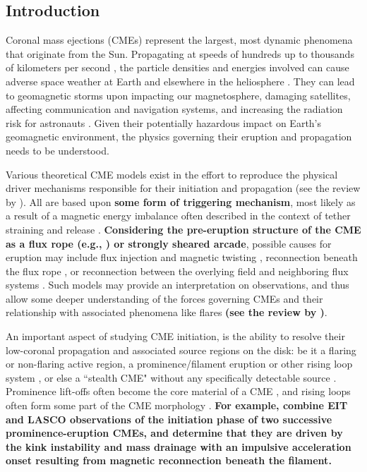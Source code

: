 \documentclass[namedreferences]{solarphysics}
\begin{document}
\begin{article}
\section{Introduction}
\label{intro}

Coronal mass ejections (CMEs) represent the largest, most dynamic phenomena that originate from the Sun. Propagating at speeds of hundreds up to thousands of kilometers per second \cite{2004JGRA..10907105Y}, the particle densities and energies involved can cause adverse space weather at Earth and elsewhere in the heliosphere \cite{2005AnGeo..23.1033S}. They can lead to geomagnetic storms upon impacting our magnetosphere, damaging satellites, affecting communication and navigation systems, and increasing the radiation risk for astronauts \cite{2007A&G....48f..11L}. Given their potentially hazardous impact on Earth's geomagnetic environment, the physics governing their eruption and propagation needs to be understood. 

Various theoretical CME models exist in the effort to reproduce the physical driver mechanisms responsible for their initiation and propagation (see the review by ). All are based upon {\bf some form of triggering mechanism}, most likely as a result of a magnetic energy imbalance often described in the context of tether straining and release \cite{2001AGUGM.125..143K}. {\bf Considering the pre-eruption structure of the CME as a flux rope (e.g., ) or strongly sheared arcade}, possible causes for eruption may include flux injection and magnetic twisting \cite{2006PhRvL..96y5002K,2001ApJ...562.1045K}, reconnection beneath the flux rope \cite{2007ApJ...658L.123L,2003ApJ...595.1231A,1995ApJ...446..377F,1980IAUS...91..207M}, or reconnection between the overlying field and neighboring flux systems \cite{2008ApJ...683.1192L,2007ApJ...671L..77V,1999ApJ...510..485A}. Such models may provide an interpretation on observations, and thus allow some deeper understanding of the forces governing CMEs and their relationship with associated phenomena like flares {\bf (see the review by )}.

An important aspect of studying CME initiation, is the ability to resolve their low-coronal propagation and associated source regions on the disk: be it a flaring or non-flaring active region, a prominence/filament eruption or other rising loop system \cite{2002ApJ...566L.117Z,2001ApJ...561..372S}, or else a ``stealth CME" without any specifically detectable source \cite{2013SoPh..285..269H}. Prominence lift-offs often become the core material of a CME \cite{2008AnGeo..26.3025F,2003ApJ...586..562G}, and rising loops often form some part of the CME morphology \cite{2006A&A...455..339D,2004A&A...422..307C}. {\bf For example,  combine EIT and LASCO observations of the initiation phase of two successive prominence-eruption CMEs, and determine that they are driven by the kink instability and mass drainage with an impulsive acceleration onset resulting from magnetic reconnection beneath the filament.}


\end{article}
\end{document}
